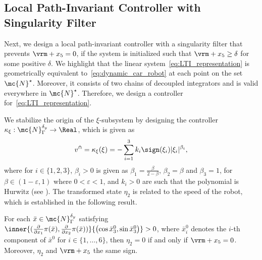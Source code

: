 \subsection{{Local Path-Invariant Controller with  Singularity Filter}}
Next, we design a local path-invariant controller with a singularity filter that prevents $\vrm + x_5 = 0$, if { the system is initialized such that $\vrm + x_5 \geq \delta$ for some positive $\delta$.} We highlight that the linear system~\eqref{eq:LTI_representation} is geometrically equivalent to~\eqref{eq:dynamic_car_robot} at each point on the set $\mc{N}^\star$. Moreover, it consists of two chains of decoupled integrators and is valid everywhere in $\mc{N}^\star$. Therefore, we design a controller for~\eqref{eq:LTI_representation}.
{We stabilize the origin of the $\xi$-subsystem by designing the  controller $\kappa_\xi: \mc{N}_\Gamma^{\by} \to \Real$, which is given as
\begin{equation}
\label{eq:v_trans}
   v^\pitchfork = \kappa_{\xi}(\xi) =  -\sum_{i=1}^{3}k_{i} \sign(\xi_{i})|\xi_i|^{\beta_i},
\end{equation}
where for $i \in \{1, 2, 3\}$, $\beta_i>0$ is given as $\beta_1 = \frac{\beta}{2-\beta}$, $\beta_2 = \beta$ and $\beta_3 = 1$, for $\beta\in (1-\varepsilon, 1)$ where $0<\varepsilon<1$, and $k_i>0$ are such that the polynomial  is Hurwitz (see \cite[Proposition 8.1]{bhat2005geometric}). 
The transformed state $\eta_2$ is related to the speed of the robot, which is established in the following result.
\begin{proposition}
\label{prop:nonzero-speed}
{\akh For each $\bar{x}\in\mc{N}_\Gamma^{\by}$ satisfying $\inner{(\frac{\partial }{\partial x_1}\pi(\bar{x}),\frac{\partial }{\partial x_2}\pi(\bar{x}))}{\left(\cos \bar{x}^{0}_3,\sin \bar{x}^{0}_3\right)} >0$, where $\bar{x}^{0}_{i}$ denotes the $i$-th component of $\bar{x}^{0}$ for $i\in\{1, \ldots,6\}$, then $\eta_2 = 0$ if and only if $\mynne{\vrm + x_5} = 0$. Moreover, $\eta_2$ and $\mynne{\vrm + x_5}$  the same sign.}

\end{proposition}}
